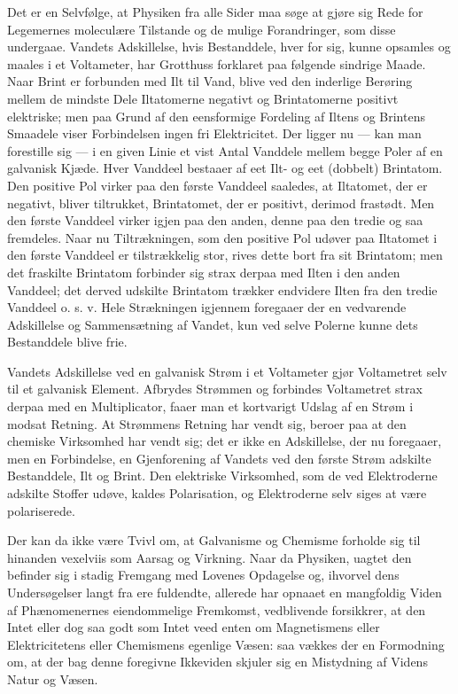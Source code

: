 \documentclass[12pt,a4paper]{book}
\begin{document}
Det er en Selvfølge, at Physiken fra alle Sider maa søge at gjøre sig Rede
for Legemernes moleculære Tilstande og de mulige Forandringer, som disse
undergaae. Vandets Adskillelse, hvis Bestanddele, hver for sig, kunne
opsamles og maales i et Voltameter, har Grotthuss forklaret paa følgende
sindrige Maade. Naar Brint er forbunden med Ilt til Vand, blive ved den
inderlige Berøring mellem de mindste Dele Iltatomerne negativt og
Brintatomerne positivt elektriske; men paa Grund af den eensformige
Fordeling af Iltens og Brintens Smaadele viser Forbindelsen ingen fri
Elektricitet. Der ligger nu --- kan man forestille sig --- i en given
Linie et vist Antal Vanddele mellem begge Poler af en galvanisk Kjæde.
Hver Vanddeel bestaaer af eet Ilt- og eet (dobbelt) Brintatom. Den
positive Pol virker paa den første Vanddeel saaledes, at Iltatomet, der er
negativt, bliver tiltrukket, Brintatomet, der er positivt, derimod
frastødt. Men den første Vanddeel virker igjen paa den anden, denne paa
den tredie og saa fremdeles. Naar nu Tiltrækningen, som den positive Pol
udøver paa Iltatomet i den første Vanddeel er tilstrækkelig stor, rives
dette bort fra sit Brintatom; men det fraskilte Brintatom forbinder sig
strax derpaa med Ilten i den anden Vanddeel; det derved udskilte Brintatom
trækker endvidere Ilten fra den tredie Vanddeel o. s. v. Hele Strækningen
igjennem foregaaer der en vedvarende Adskillelse og Sammensætning af
Vandet, kun ved selve Polerne kunne dets Bestanddele blive frie.

Vandets Adskillelse ved en galvanisk Strøm i et Voltameter gjør
Voltametret selv til et galvanisk Element.
Afbrydes Strømmen og forbindes Voltametret strax derpaa med en
Multiplicator, faaer man et kortvarigt Udslag af en Strøm i modsat
Retning. At Strømmens Retning har vendt sig, beroer paa at den chemiske
Virksomhed har vendt sig; det er ikke en Adskillelse, der nu foregaaer,
men en Forbindelse, en Gjenforening af Vandets ved den første Strøm
adskilte Bestanddele, Ilt og Brint. Den elektriske Virksomhed, som de ved
Elektroderne adskilte Stoffer udøve, kaldes Polarisation, og Elektroderne
selv siges at være polariserede.

Der kan da ikke være Tvivl om, at Galvanisme og Chemisme forholde sig til
hinanden vexelviis som Aarsag og Virkning. Naar da Physiken, uagtet den
befinder sig i stadig Fremgang med Lovenes Opdagelse og, ihvorvel dens
Undersøgelser langt fra ere fuldendte, allerede har opnaaet en mangfoldig
Viden af Phænomenernes eiendommelige Fremkomst, vedblivende forsikkrer, at
den Intet eller dog saa godt som Intet veed enten om Magnetismens eller
Elektricitetens eller Chemismens egenlige Væsen: saa vækkes der en
Formodning om, at der bag denne foregivne Ikkeviden skjuler sig en
Mistydning af Videns Natur og Væsen.
\end{document}
